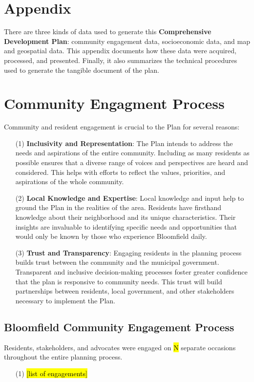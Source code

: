 \appendix
\section*{Appendix}

\noindent There are three kinds of data used to generate this \textbf{\textcolor{coBalt}{Comprehensive Development Plan}}: community engagement data, socioeconomic data, and map and geospatial data. This appendix documents how these data were acquired, processed, and presented. Finally, it also summarizes the technical procedures used to generate the tangible document of the plan.

\section{Community Engagment Process}

\noindent Community and resident engagement is crucial to the Plan for several reasons:
\begin{enumerate}
    \item [(1)] \textbf{Inclusivity and Representation}: The Plan intends to address the needs and aspirations of the entire community. Including as many residents as possible ensures that a diverse range of voices and perspectives are heard and considered. This helps with efforts to reflect the values, priorities, and aspirations of the whole community.
    \item [(2)] \textbf{Local Knowledge and Expertise}: Local knowledge and input help to ground the Plan in the realities of the area. Residents have firsthand knowledge about their neighborhood and its unique characteristics. Their insights are invaluable to identifying specific needs and opportunities that would only be known by those who experience Bloomfield daily.
    \item [(3)] \textbf{Trust and Transparency}: Engaging residents in the planning process builds trust between the community and the municipal government. Transparent and inclusive decision-making processes foster greater confidence that the plan is responsive to community needs. This trust will build partnerships between residents, local government, and other stakeholders necessary to implement the Plan.
\end{enumerate}

\subsection{Bloomfield Community Engagement Process}
\noindent Residents, stakeholders, and advocates were engaged on \hl{N} separate occasions throughout the entire planning process.
\begin{enumerate}
    \item [(1)] \hl{[list of engagements]}
\end{enumerate}

